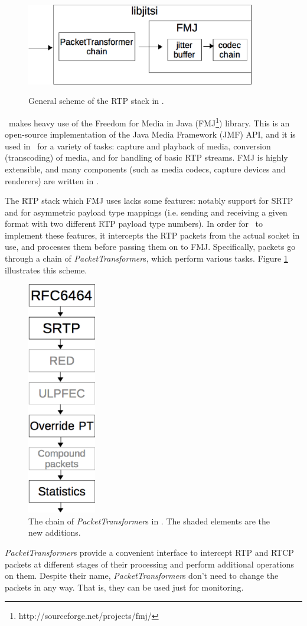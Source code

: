 \documentclass[twoside,openright,a4paper,12pt,english]{article}
\begin{document}
\begin{figure}
    \centering
    \includegraphics[width=10cm]{./pics/lj.eps}
    \label{lj-scheme}
    \caption{General scheme of the RTP stack in \lj.}
\end{figure}

\lj\ makes heavy use of the Freedom for Media in Java
(FMJ\footnote{http://sourceforge.net/projects/fmj/}) library. This is an
open-source implementation of the Java Media Framework (JMF) API, and it is
used in \lj\ for a variety of tasks: capture and playback of media, conversion
(transcoding) of media, and for handling of basic RTP streams. FMJ is highly extensible, and
many components (such as media codecs, capture devices and renderers) are written in \lj.


The RTP stack which FMJ uses lacks some features: notably support for SRTP and 
for asymmetric payload type mappings (i.e. sending and receiving a given format
with two different RTP payload type numbers). In order for \lj\ to implement these features, it
intercepts the RTP packets from the actual socket in use, and processes them
before passing them on to FMJ. Specifically, packets go through a chain of
\emph{PacketTransformer}s, which perform various tasks. Figure \ref{lj-scheme}
illustrates this scheme.

\begin{figure}
   \centering
        \includegraphics[width=3cm]{./pics/lj-pt.eps}
        \caption{The chain of \emph{PacketTransformer}s in \lj. The shaded elements are the new additions.}
   \label{lj-pt}
\end{figure}
\emph{PacketTransformer}s provide a convenient interface to intercept RTP and
RTCP packets at different stages of their processing and perform additional
operations on them. Despite their name, \emph{PacketTransformer}s don't need to change
the packets in any way. That is, they can be used just for monitoring. 
\end{document}

